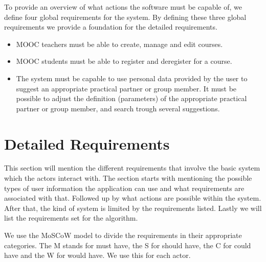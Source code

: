To provide an overview of what actions the software must be capable of, we define four global requirements for the system.
By defining these three global requirements we provide a foundation for the detailed requirements.
\begin{itemize}
\item MOOC teachers must be able to create, manage and edit courses.

\item MOOC students must be able to register and deregister for a course.

\item The system must be capable to use personal data provided by the user to suggest an appropriate practical partner or group member.
It must be possible to adjust the definition (parameters) of the appropriate practical partner or group member, and search trough several suggestions.
\end{itemize}

\section{Detailed Requirements}
This section will mention the different requirements that involve the basic system which the actors interact with.
The section starts with mentioning the possible types of user information the application can use and what requirements are associated with that.
Followed up by what actions are possible within the system.
After that, the kind of system is limited by the requirements listed.
Lastly we will list the requirements set for the algorithm.

We use the MoSCoW model to divide the requirements in their appropriate categories.
The M stands for must have, the S for should have, the C for could have and the W for would have.\cite{moscow}
We use this for each actor.

